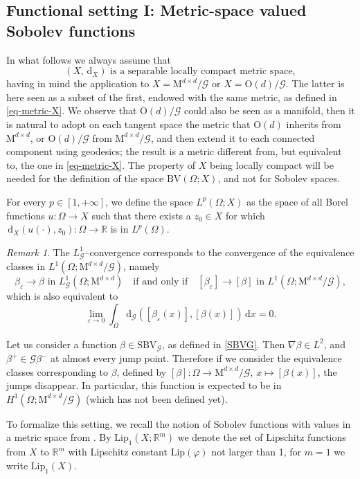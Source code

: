 \documentclass[a4paper,reqno]{amsart}
\newcommand\R{\mathbb{R}}
\newcommand{\BV}{\mathrm{BV}}
\newcommand{\SBVG}{\mathrm{SBV}_{\mathcal{G}}}
\newcommand{\ebeta}{{[\beta]}}
\newcommand{\dG}{\mathrm{d}_{\G}}
\newcommand\LG{{L}^1_\G}
\newcommand\dix{{\,\mathrm{d}_X}}
\theoremstyle{remark}
\newtheorem{remark}[definition]{Remark}
\def\e{\varepsilon}
\newcommand\dx{{\,\mathrm{d}x}}
\newcommand{\G}{\mathcal{G}}
\newcommand{\On}{\mathrm{O}(d)}
\newcommand{\OnG}{{\On}/{\G}}
\newcommand{\Mno}{\mathrm{M}^{d\times d}}
\newcommand{\Lip}{\mathrm{Lip}}
\numberwithin{equation}{section}
\begin{document}
\subsection{Functional setting I: Metric-space valued Sobolev functions}\label{subsec:functionalsetting}
In what follows we always assume that
\begin{equation*}
	(X,\dix) \text{ is a separable locally compact metric space},
\end{equation*}
having in mind the application to $X=\Mno/\G$ or $X=\OnG$.
The latter is here seen as a subset of the first, endowed with the same metric, as defined in \eqref{eq-metric-X}. We observe that $\OnG$ could also be seen as a manifold, then it is natural to adopt on each tangent space the metric
that $\On$ inherits from $\Mno$, or $\On/\G$ from $\Mno/\G$, and then extend it to each connected component using geodesics; the result is a metric different from, but equivalent to, the one in
\eqref{eq-metric-X}.
The property of  $X$ being locally compact will be needed for the definition of the space  $\BV(\Omega; X)$, and not for Sobolev  spaces.  

\smallskip

For every $p\in[1,+\infty]$, we define the space $L^p(\Omega  ;  X)$  as  the space of all Borel functions $u:\Omega\to X$ such that there exists a $z_0\in X$ for which  $\dix (u(\cdot),z_0):\Omega\to\R$ is in $L^p(\Omega)$.
\begin{remark}\label{rem:1104251642}
	The $\LG$--convergence corresponds to the convergence of the equivalence classes in $L^1(\Omega;\Mno/\G)$, namely
	\[
	\beta_\varepsilon\to \beta \text{ in }\LG(\Omega;\Mno) \quad \text{if and only if} \quad [\beta_\varepsilon] \to \ebeta \text{ in }L^1(\Omega; {\Mno}/{\G}),
	\] 
	which is also equivalent to
	\[
	\lim_{\e \to 0} \int_\Omega \dG([\beta_\e(x)],[\beta(x)])\dx= 0.
	\]
\end{remark}


Let us consider a function $\beta\in \SBVG$, as defined in
\eqref{SBVG}. Then $\nabla\beta\in L^2$,
and $\beta^+\in \G \beta^-$ at almost every jump point. Therefore if we consider the equivalence classes corresponding to $\beta$, defined by
$[\beta]:\Omega\to\Mno/\G$, $x\mapsto [\beta(x)]$, the jumps disappear. In particular, this function is expected to be in $H^1(\Omega;\Mno/\G)$ (which has not been defined yet).

To formalize this setting, we recall the notion of Sobolev functions with values in a metric space from \cite{Resh}.
By $\Lip_1(X;\R^m)$ we denote the set of Lipschitz functions from  $X$  to $\R^m$ with Lipschitz constant $\Lip(\varphi)$ not larger than 1, 
for $m=1$ we write $\Lip_1(X)$.
\end{document}
